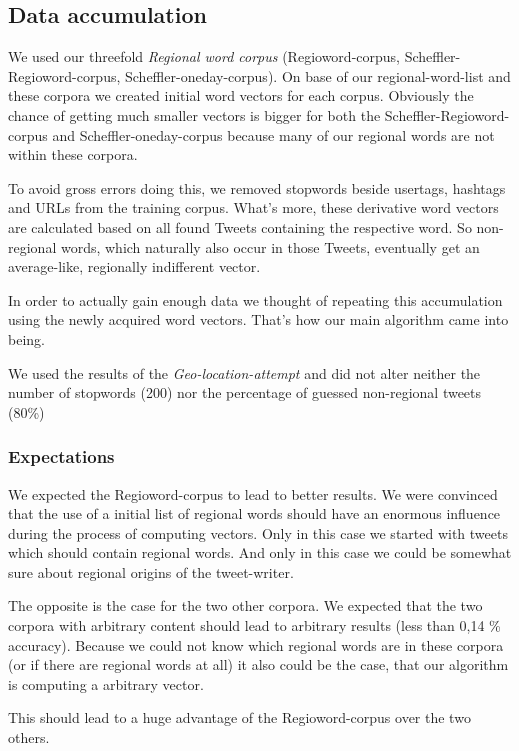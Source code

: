 \documentclass[./Main.tex]{subfiles}
\begin{document}
\subsection{Data accumulation}
We used our threefold \emph{Regional word corpus} (Regioword-corpus, Scheffler-Regioword-corpus, Scheffler-oneday-corpus). On base of our regional-word-list and these corpora we created initial word vectors for each corpus. Obviously the chance of getting much smaller vectors is bigger for both the Scheffler-Regioword-corpus and Scheffler-oneday-corpus because many of our regional words are not within these corpora.

To avoid gross errors doing this, we removed stopwords beside usertags, hashtags and URLs from the training corpus. What's more, these derivative word vectors are calculated based on all found Tweets containing the respective word. So non-regional words, which naturally also occur in those Tweets, eventually get an average-like, regionally indifferent vector.

In order to actually gain enough data we thought of repeating this accumulation using the newly acquired word vectors. That's how our main algorithm came into being. 

We used the results of the \emph{Geo-location-attempt} and did not alter neither the number of stopwords (200) nor the percentage of guessed non-regional tweets (80\%)

\subsubsection{Expectations}
We expected the Regioword-corpus to lead to better results. We were convinced that the use of a initial list of regional words should have an enormous influence during the process of computing vectors. Only in this case we started with tweets which should contain regional words. And only in this case we could be somewhat sure about regional origins of the tweet-writer.

The opposite is the case for the two other corpora. We expected that the two corpora with arbitrary content should lead to arbitrary results (less than 0,14 \% accuracy). Because we could not know which regional words are in these corpora (or if there are regional words at all) it also could be the case, that our algorithm is computing a arbitrary vector.

This should lead to a huge advantage of the Regioword-corpus over the two others.
\end{document}
